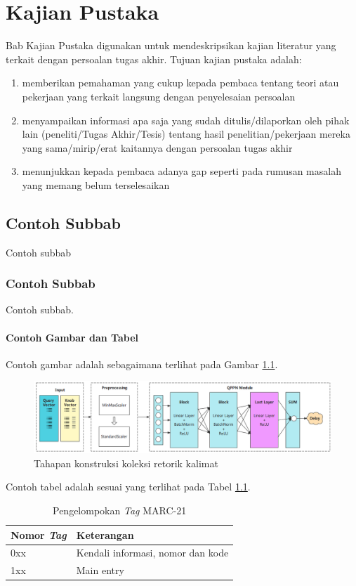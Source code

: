 \chapter{Kajian Pustaka}

Bab Kajian Pustaka digunakan untuk mendeskripsikan kajian literatur yang terkait dengan persoalan tugas akhir. Tujuan kajian pustaka adalah:
\begin{enumerate}
\item memberikan pemahaman yang cukup kepada pembaca tentang teori atau pekerjaan yang terkait langsung dengan penyelesaian persoalan

\item menyampaikan informasi apa saja yang sudah ditulis/dilaporkan oleh pihak lain (peneliti/Tugas Akhir/Tesis) tentang hasil penelitian/pekerjaan mereka yang sama/mirip/erat kaitannya dengan persoalan tugas akhir

\item menunjukkan kepada pembaca adanya gap seperti pada rumusan masalah yang memang belum terselesaikan
\end{enumerate}

\section{Contoh Subbab}
Contoh subbab

\subsection{Contoh Subbab}
Contoh subbab.

\subsubsection{Contoh Gambar dan Tabel}
Contoh gambar adalah sebagaimana terlihat pada Gambar \ref{fig:eg}.
\begin{figure}
    \centering
    \includegraphics[width=0.8\linewidth]{images/QPPN.png}
    \caption{Tahapan konstruksi koleksi retorik kalimat}
    \label{fig:eg}
\end{figure}

Contoh tabel adalah sesuai yang terlihat pada Tabel \ref{tab:my_label}.
\begin{table}[]
    \centering
    \begin{tabular}{|l|l|}
    \hline
    Nomor \textit{Tag}  & Keterangan \\
    \hline
        0xx  & Kendali informasi, nomor dan kode\\
        \hline
        1xx & Main entry\\
    \hline
    \end{tabular}
    \caption{Pengelompokan \textit{Tag} MARC-21}
    \label{tab:my_label}
\end{table}